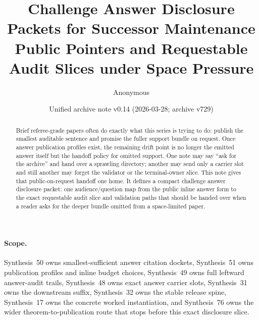 \documentclass[11pt]{article}
\title{Challenge Answer Disclosure Packets for Successor Maintenance\\\large Public Pointers and Requestable Audit Slices under Space Pressure}
\author{Anonymous}
\date{Unified archive note v0.14 (2026-03-28; archive v729)}
\begin{document}
\maketitle

\begin{abstract}
Brief referee-grade papers often do exactly what this series is trying to do: publish the smallest auditable sentence and promise the fuller support bundle on request. Once answer publication profiles exist, the remaining drift point is no longer the emitted answer itself but the handoff policy for omitted support. One note may say ``ask for the archive'' and hand over a sprawling directory; another may send only a carrier slot and still another may forget the validator or the terminal-owner slice. This note gives that public-on-request handoff one home. It defines a compact challenge answer disclosure packet: one audience/question map from the public inline answer form to the exact requestable audit slice and validation paths that should be handed over when a reader asks for the deeper bundle omitted from a space-limited paper.
\end{abstract}

\paragraph{Scope.}
Synthesis~50 owns smallest-sufficient answer citation dockets, Synthesis~51 owns publication profiles and inline budget choices, Synthesis~49 owns full leftward answer-audit trails, Synthesis~48 owns exact answer carrier slots, Synthesis~31 owns the downstream suffix, Synthesis~32 owns the stable release spine, Synthesis~17 owns the concrete worked instantiation, and Synthesis~76 owns the wider theorem-to-publication route that stops before this exact disclosure slice.\cite{series:challengeanswercitationdockets,series:challengeanswerpublicationprofiles,series:challengeansweraudittrails,series:challengeanswercarrierslots,series:downstreamnormalforms,series:releasespine,series:workedexample,series:theoremtopublicationspine}
\end{document}
